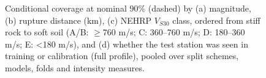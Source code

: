\begin{figure}[htbp]
\centering
{}
\caption{Conditional coverage at nominal 90\% (dashed) by (a) magnitude, (b) rupture distance (km), (c) NEHRP $V_{S30}$ class, ordered from stiff rock to soft soil (A/B: $\geq$760 m/s; C: 360–760 m/s; D: 180–360 m/s; E: <180 m/s), and (d) whether the test station was seen in training or calibration (full profile), pooled over split schemes, models, folds and intensity measures.}
\label{fig:fig6_conditional_coverage}
\end{figure}
